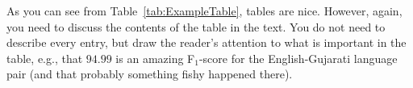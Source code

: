 As you can see from Table~\ref{tab:ExampleTable}, tables are nice. 
However, again, you need to discuss the contents of the table in the text. 
You do not need to describe every entry, but draw the reader's attention to what is important in the table,
e.g., that $94.99$ is an amazing F$_1$-score for the English-Gujarati language pair (and that probably something fishy happened there). 
